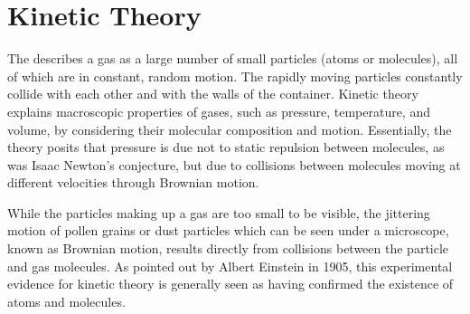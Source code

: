 \section{Kinetic Theory}
The  describes a gas as a large number of small particles (atoms or molecules), all of which are in constant, random motion. The rapidly moving particles constantly collide with each other and with the walls of the container. Kinetic theory explains macroscopic properties of gases, such as pressure, temperature, and volume, by considering their molecular composition and motion. Essentially, the theory posits that pressure is due not to static repulsion between molecules, as was Isaac Newton's conjecture, but due to collisions between molecules moving at different velocities through Brownian motion.

While the particles making up a gas are too small to be visible, the jittering motion of pollen grains or dust particles which can be seen under a microscope, known as Brownian motion, results directly from collisions between the particle and gas molecules. As pointed out by Albert Einstein in 1905, this experimental evidence for kinetic theory is generally seen as having confirmed the existence of atoms and molecules.


